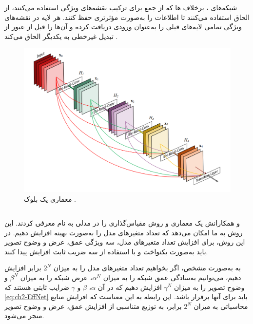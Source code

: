 شبکه‌های 
،
 برخلاف
  ها
که از جمع برای ترکیب نقشه‌های ویژگی استفاده می‌کنند، از الحاق 
   استفاده می‌کنند تا اطلاعات را به‌صورت مؤثرتری حفظ کنند. هر لایه در
    نقشه‌های ویژگی تمامی لایه‌های قبلی را به‌عنوان ورودی دریافت کرده و آن‌ها را قبل از عبور از تبدیل غیرخطی به یکدیگر الحاق می‌کند \cite{huang2017densely}.

\begin{figure}[h]
    \centering
    \includegraphics[width=1\textwidth]{Images/Chapter2/DenseNet.PNG}
    \caption{معماری یک بلوک
     \cite{huang2017densely}.}
    \label{fig:densenet_architecture}
\end{figure}






\subsection{}

\cite{tan2019efficientnet} 
 و همکارانش یک معماری و روش مقیاس‌گذاری را در مدلی به نام 
  معرفی کردند. این روش به ما امکان می‌دهد که تعداد متغیرهای مدل را به‌صورت بهینه افزایش دهیم. در این روش، برای افزایش تعداد متغیرهای مدل، سه ویژگی عمق، عرض و وضوح
  تصویر باید به‌صورت یکنواخت و با استفاده از سه ضریب ثابت افزایش پیدا کنند.

به به‌صورت مشخص، اگر بخواهیم تعداد متغیر‌های مدل را به میزان \(2^N\) برابر افزایش دهیم، می‌توانیم به‌سادگی عمق شبکه را به میزان \( \alpha^N \)، عرض شبکه را به میزان \( \beta^N \) و وضوح تصویر را به میزان \( \gamma^N \) افزایش دهیم که در آن \(\alpha\)، \(\beta\) و \(\gamma\) ضرایب ثابتی هستند که 
\autoref{eq:ch2-EffNet}
باید برای آنها برقرار باشد. این رابطه به این معناست که افزایش منابع محاسباتی به میزان \(2^N\) برابر، به توزیع متناسبی از افزایش عمق، عرض و وضوح تصویر منجر می‌شود. 

